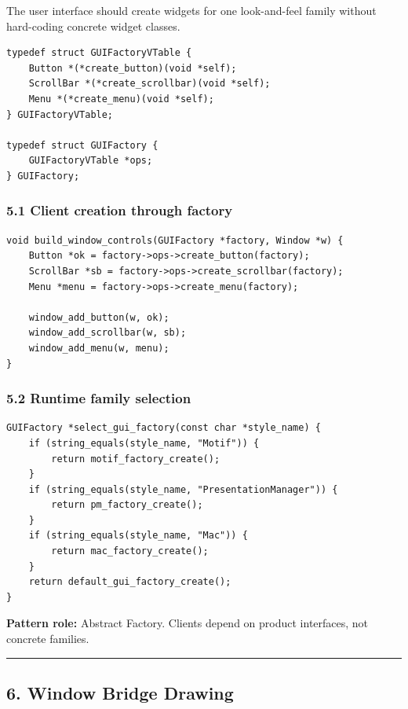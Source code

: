 \documentclass[11pt]{article}
\begin{document}
The user interface should create widgets for one look-and-feel family without hard-coding concrete widget classes.

\begin{verbatim}
typedef struct GUIFactoryVTable {
    Button *(*create_button)(void *self);
    ScrollBar *(*create_scrollbar)(void *self);
    Menu *(*create_menu)(void *self);
} GUIFactoryVTable;

typedef struct GUIFactory {
    GUIFactoryVTable *ops;
} GUIFactory;
\end{verbatim}

\subsubsection{5.1 Client creation through factory}\label{client-creation-through-factory}

\begin{verbatim}
void build_window_controls(GUIFactory *factory, Window *w) {
    Button *ok = factory->ops->create_button(factory);
    ScrollBar *sb = factory->ops->create_scrollbar(factory);
    Menu *menu = factory->ops->create_menu(factory);

    window_add_button(w, ok);
    window_add_scrollbar(w, sb);
    window_add_menu(w, menu);
}
\end{verbatim}

\subsubsection{5.2 Runtime family selection}\label{runtime-family-selection}

\begin{verbatim}
GUIFactory *select_gui_factory(const char *style_name) {
    if (string_equals(style_name, "Motif")) {
        return motif_factory_create();
    }
    if (string_equals(style_name, "PresentationManager")) {
        return pm_factory_create();
    }
    if (string_equals(style_name, "Mac")) {
        return mac_factory_create();
    }
    return default_gui_factory_create();
}
\end{verbatim}

\textbf{Pattern role:} Abstract Factory. Clients depend on product interfaces, not concrete families.

\begin{center}\rule{0.5\linewidth}{0.5pt}\end{center}

\subsection{6. Window Bridge Drawing}\label{window-bridge-drawing}
\end{document}
